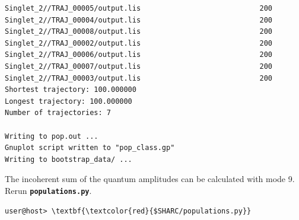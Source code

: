 \documentclass[a4paper,11pt,DIV=15,openany]{scrbook}
\newcommand{\ttt}[1]{\textbf{\texttt{#1}}}
\begin{document}
\begin{oframed}
\begin{Verbatim}[commandchars=\\\{\}]
Singlet_2//TRAJ_00005/output.lis                            200
Singlet_2//TRAJ_00004/output.lis                            200
Singlet_2//TRAJ_00008/output.lis                            200
Singlet_2//TRAJ_00002/output.lis                            200
Singlet_2//TRAJ_00006/output.lis                            200
Singlet_2//TRAJ_00007/output.lis                            200
Singlet_2//TRAJ_00003/output.lis                            200
Shortest trajectory: 100.000000
Longest trajectory: 100.000000
Number of trajectories: 7

Writing to pop.out ...
Gnuplot script written to "pop_class.gp"
Writing to bootstrap_data/ ...
\end{Verbatim}
\end{oframed}

\normalsize
The incoherent sum of the quantum amplitudes can be calculated with mode 9. Rerun \ttt{populations.py}.
\begin{Verbatim}[commandchars=\\\{\}]
user@host> \textbf{\textcolor{red}{$SHARC/populations.py}}
\end{Verbatim}
\end{document}
